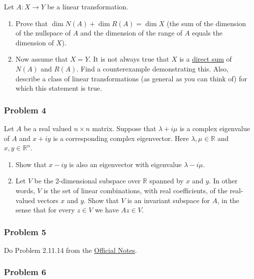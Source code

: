 Let \(A: X \to Y\) be a linear transformation.

\begin{enumerate}
\def\labelenumi{(\alph{enumi})}
\tightlist
\item
  Prove that \(\dim N (A) + \dim R(A) = \dim X\) (the sum of the
  dimension of the nullspace of \(A\) and the dimension of the range of
  \(A\) equals the dimension of \(X\)).
\item
  Now assume that \(X = Y\). It is not always true that \(X\) is a
  \href{exlecs/lec02.html\#def-directsum}{direct sum} of \(N(A)\) and
  \(R(A)\). Find a counterexample demonstrating this. Also, describe a
  class of linear transformations (as general as you can think of) for
  which this statement is true.
\end{enumerate}

\subsubsection{Problem 4}\label{problem-4}

Let \(A\) be a real valued \(n \times n\) matrix. Suppose that
\(\lambda + i \mu\) is a complex eigenvalue of \(A\) and \(x + iy\) is a
corresponding complex eigenvector. Here \(\lambda, \mu \in \mathbb{R}\)
and \(x, y \in \mathbb{R}^n\).

\begin{enumerate}
\def\labelenumi{\alph{enumi}.}
\item
  Show that \(x-iy\) is also an eigenvector with eigenvalue
  \(\lambda - i \mu\).
\item
  Let \(V\) be the 2-dimensional subspace over \(\mathbb{R}\) spanned by
  \(x\) and \(y\). In other words, \(V\) is the set of linear
  combinations, with real coefficients, of the real-valued vectors \(x\)
  and \(y\). Show that \(V\) is an invariant subspace for \(A\), in the
  sense that for every \(z \in V\) we have \(Az
   \in V\).
\end{enumerate}

\subsubsection{Problem 5}\label{problem-5}

Do Problem 2.11.14 from the
\href{https://arxiv.org/pdf/2007.01367}{Official Notes}.

\subsubsection{Problem 6}\label{problem-6}


